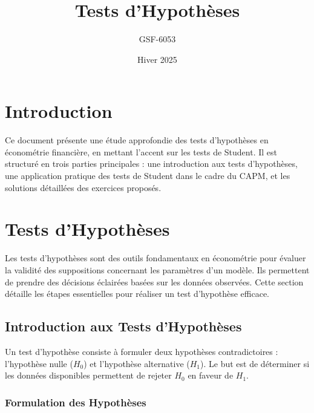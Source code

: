 \documentclass[14pt]{extarticle} %
\title{Tests d'Hypothèses}
\author{GSF-6053}
\date{Hiver 2025}
\theoremstyle{definition}
\theoremstyle{plain}
\begin{document}
\maketitle

\tableofcontents
\newpage

\onehalfspacing


\section{Introduction}

Ce document présente une étude approfondie des tests d'hypothèses en économétrie financière, en mettant l'accent sur les tests de Student. Il est structuré en trois parties principales : une introduction aux tests d'hypothèses, une application pratique des tests de Student dans le cadre du CAPM, et les solutions détaillées des exercices proposés.

\section{Tests d'Hypothèses}

Les tests d'hypothèses sont des outils fondamentaux en économétrie pour évaluer la validité des suppositions concernant les paramètres d'un modèle. Ils permettent de prendre des décisions éclairées basées sur les données observées. Cette section détaille les étapes essentielles pour réaliser un test d'hypothèse efficace.

\subsection{Introduction aux Tests d'Hypothèses}

Un test d’hypothèse consiste à formuler deux hypothèses contradictoires : l'hypothèse nulle (\(H_0\)) et l'hypothèse alternative (\(H_1\)). Le but est de déterminer si les données disponibles permettent de rejeter \(H_0\) en faveur de \(H_1\).

\subsubsection{Formulation des Hypothèses}
\end{document}
